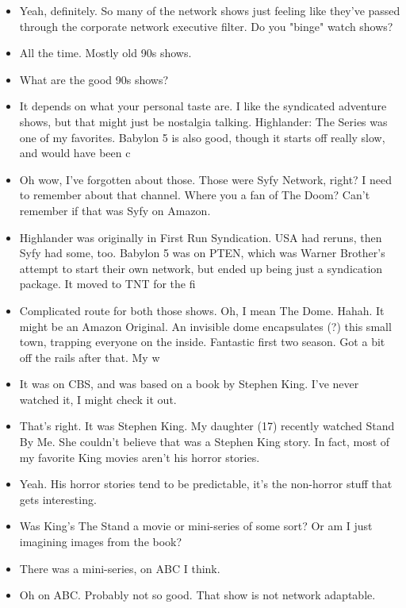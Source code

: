 \documentclass[11pt,a4paper]{article}
\begin{document}
\begin{itemize}
\item[\ding{173}] Yeah, definitely. So many of the network shows just feeling like they've passed through the corporate network executive filter. Do you "binge" watch shows?
\item[\ding{172}] All the time. Mostly old 90s shows. 
\item[\ding{173}] What are the good 90s shows?
\item[\ding{172}] It depends on what your personal taste are.  I like the syndicated adventure shows, but that might just be nostalgia talking.  Highlander: The Series was one of my favorites.  Babylon 5 is also good, though it starts off really slow, and would have been c
\item[\ding{173}] Oh wow, I've forgotten about those.  Those were Syfy Network, right? I need to remember about that channel. Where you a fan of The Doom? Can't remember if that was Syfy on Amazon.
\item[\ding{172}] Highlander was originally in First Run Syndication.  USA had reruns, then Syfy had some, too.  Babylon 5 was on PTEN, which was Warner Brother's attempt to start their own network, but ended up being just a syndication package.  It moved to TNT for the fi
\item[\ding{173}] Complicated route for both those shows. Oh, I mean The Dome.  Hahah.  It might be an Amazon Original. An invisible dome encapsulates (?) this small town, trapping everyone on the inside. Fantastic first two season. Got a bit off the rails after that. My w
\item[\ding{172}] It was on CBS, and was based on a book by Stephen King.  I've never watched it, I might check it out. 
\item[\ding{173}] That's right. It was Stephen King. My daughter (17) recently watched Stand By Me. She couldn't believe that was a Stephen King story.  In fact, most of my favorite King movies aren't his horror stories.
\item[\ding{172}] Yeah. His horror stories tend to be predictable, it's the non-horror stuff that gets interesting. 
\item[\ding{173}] Was  King's The Stand a movie or mini-series of some sort? Or am I just imagining images from the book? 
\item[\ding{172}] There was a mini-series, on ABC I think. 
\item[\ding{173}] Oh on ABC. Probably not so good.  That show is not network adaptable. 
\end{itemize}
\end{document}

